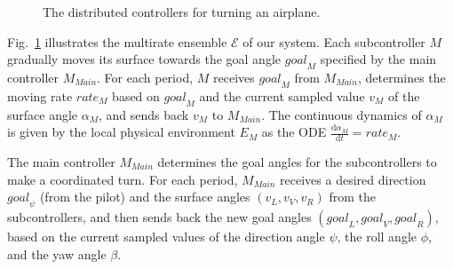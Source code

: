 \begin{figure}
\caption{The distributed controllers for turning an airplane.} \label{fig:airplane-ctrl}
\end{figure}


Fig.~\ref{fig:airplane-ctrl} illustrates the multirate ensemble $\mathcal{E}$ of our system.
Each subcontroller $M$ gradually moves its surface towards the goal angle $\mathit{goal}_M$ specified by the main controller $M_\mathit{Main}$.
For each period, $M$ receives $\mathit{goal}_M$ from $M_\mathit{Main}$,
determines the moving rate $\mathit{rate}_M$ based on $\mathit{goal}_M$ 
and the current sampled value $v_M$ of the surface angle $\alpha_M$,
and sends back $v_M$ to $M_\mathit{Main}$.
The continuous dynamics of $\alpha_M$ is given 
by the local physical environment $E_M$
as the ODE $\frac{\mathrm{d}\alpha_M}{\mathrm{d}t} = \mathit{rate}_M$.

The main controller $M_\mathit{Main}$ determines the goal angles for the subcontrollers to make a coordinated turn.
For each period, $M_\mathit{Main}$ receives a  desired direction $\mathit{goal}_\psi$ %
(from the pilot)
and the surface angles $(v_L, v_V, v_R)$ from the subcontrollers, 
and then sends back the new goal angles $(\mathit{goal}_L,\mathit{goal}_V,\mathit{goal}_R)$,
based on the current sampled values of  the direction angle $\psi$, the roll angle $\phi$, and the yaw angle $\beta$.

